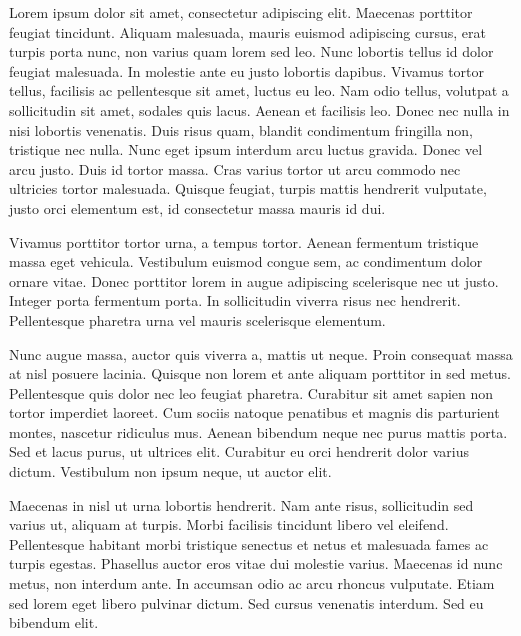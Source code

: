 

Lorem ipsum dolor sit amet, consectetur adipiscing elit. Maecenas porttitor feugiat tincidunt. Aliquam malesuada, mauris euismod adipiscing cursus, erat turpis porta nunc, non varius quam lorem sed leo. Nunc lobortis tellus id dolor feugiat malesuada. In molestie ante eu justo lobortis dapibus. Vivamus tortor tellus, facilisis ac pellentesque sit amet, luctus eu leo. Nam odio tellus, volutpat a sollicitudin sit amet, sodales quis lacus. Aenean et facilisis leo. Donec nec nulla in nisi lobortis venenatis. Duis risus quam, blandit condimentum fringilla non, tristique nec nulla. Nunc eget ipsum interdum arcu luctus gravida. Donec vel arcu justo. Duis id tortor massa. Cras varius tortor ut arcu commodo nec ultricies tortor malesuada. Quisque feugiat, turpis mattis hendrerit vulputate, justo orci elementum est, id consectetur massa mauris id dui.

Vivamus porttitor tortor urna, a tempus tortor. Aenean fermentum tristique massa eget vehicula. Vestibulum euismod congue sem, ac condimentum dolor ornare vitae. Donec porttitor lorem in augue adipiscing scelerisque nec ut justo. Integer porta fermentum porta. In sollicitudin viverra risus nec hendrerit. Pellentesque pharetra urna vel mauris scelerisque elementum.



Nunc augue massa, auctor quis viverra a, mattis ut neque. Proin consequat massa at nisl posuere lacinia. Quisque non lorem et ante aliquam porttitor in sed metus. Pellentesque quis dolor nec leo feugiat pharetra. Curabitur sit amet sapien non tortor imperdiet laoreet. Cum sociis natoque penatibus et magnis dis parturient montes, nascetur ridiculus mus. Aenean bibendum neque nec purus mattis porta. Sed et lacus purus, ut ultrices elit. Curabitur eu orci hendrerit dolor varius dictum. Vestibulum non ipsum neque, ut auctor elit.

Maecenas in nisl ut urna lobortis hendrerit. Nam ante risus, sollicitudin sed varius ut, aliquam at turpis. Morbi facilisis tincidunt libero vel eleifend. Pellentesque habitant morbi tristique senectus et netus et malesuada fames ac turpis egestas. Phasellus auctor eros vitae dui molestie varius. Maecenas id nunc metus, non interdum ante. In accumsan odio ac arcu rhoncus vulputate. Etiam sed lorem eget libero pulvinar dictum. Sed cursus venenatis interdum. Sed eu bibendum elit.

